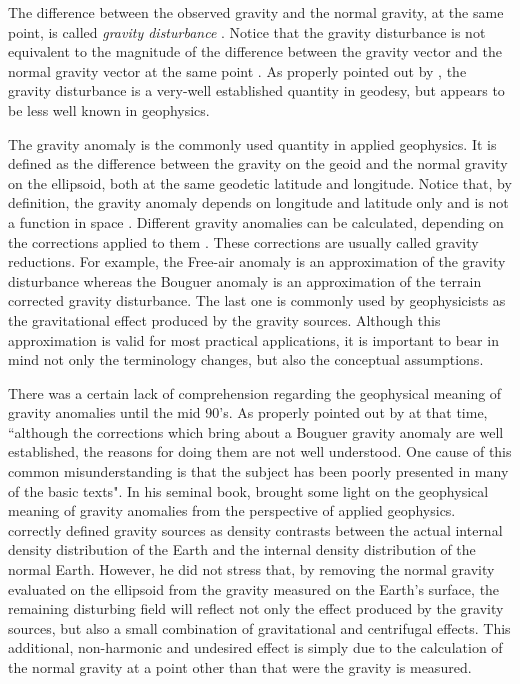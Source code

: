 \documentclass[extra]{gji}
\begin{document}
The difference between the observed gravity and the
normal gravity, at the same point, is called \textit{gravity disturbance}
\citep{heiskanen-moritz1967, hofmann-wellenhof-moritz2005}.
Notice that the gravity disturbance is not equivalent to the
magnitude of the difference between the gravity vector
and the normal gravity vector at the same point 
\citep{barthelmes2013, sanso_sideris2013}.
As properly pointed out by \citet{hackney-featherstone2003},
the gravity disturbance is a very-well established quantity in geodesy,
but appears to be less well known in geophysics.

The gravity anomaly is the commonly used quantity in applied 
geophysics. It is defined as the difference
between the gravity on the geoid and the normal gravity on the ellipsoid,
both at the same geodetic latitude and longitude.
Notice that, by definition, the gravity anomaly depends on 
longitude and latitude only and is not a function in space 
\citep{barthelmes2013}.
Different gravity anomalies can be calculated, depending on the
corrections applied to them \citep{blakely1996, hofmann-wellenhof-moritz2005}.
These corrections are usually called gravity reductions.
For example, the Free-air anomaly is an approximation of the
gravity disturbance whereas the Bouguer anomaly
is an approximation of the terrain corrected gravity disturbance.
The last one is commonly used by geophysicists as the
gravitational effect produced by the gravity sources.
Although this approximation is valid for most practical applications,
it is important to bear in mind not only the terminology 
changes, but also the conceptual assumptions.

There was a certain lack of comprehension regarding the
geophysical meaning of gravity anomalies until the
mid 90's.
As properly pointed out by \citet{chapin1996} at that time, 
``although the corrections which bring about a Bouguer 
gravity anomaly are well established, the reasons for doing
them are not well understood. One cause of this common 
misunderstanding is that the subject has been poorly presented in
many of the basic texts".
In his seminal book, \citet{blakely1996} brought some light
on the geophysical meaning of gravity anomalies from the 
perspective of applied geophysics. \citet{blakely1996} correctly
defined gravity sources as density contrasts between the actual
internal density distribution of the Earth and the internal density
distribution of the normal Earth.
However, he did not stress that, by removing the normal gravity 
evaluated on the ellipsoid from the gravity measured 
on the Earth's surface, the remaining disturbing field will reflect 
not only the effect produced by the gravity sources, but also a
small combination of gravitational and centrifugal effects.
This additional, non-harmonic and undesired effect is 
simply due to the calculation of the normal gravity at a point
other than that were the gravity is measured.
\end{document}
